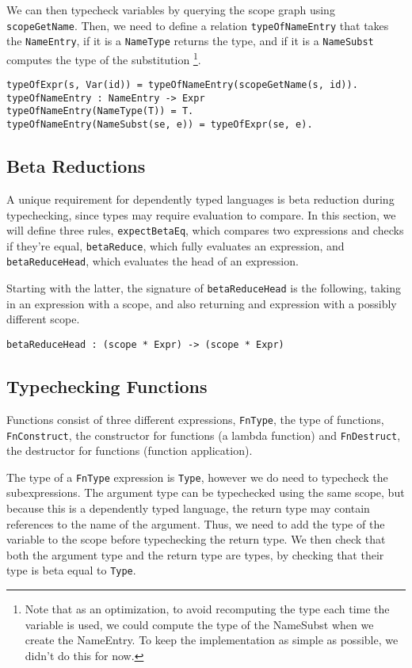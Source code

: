 We can then typecheck variables by querying the scope graph using \verb|scopeGetName|. Then, we need to define a relation \verb|typeOfNameEntry| that takes the \verb|NameEntry|, if it is a \verb|NameType| returns the type, and if it is a \verb|NameSubst| computes the type of the substitution \footnote{Note that as an optimization, to avoid recomputing the type each time the variable is used, we could compute the type of the NameSubst when we create the NameEntry. To keep the implementation as simple as possible, we didn't do this for now.}. 

\begin{lstlisting}
typeOfExpr(s, Var(id)) = typeOfNameEntry(scopeGetName(s, id)).
typeOfNameEntry : NameEntry -> Expr
typeOfNameEntry(NameType(T)) = T.
typeOfNameEntry(NameSubst(se, e)) = typeOfExpr(se, e).
\end{lstlisting}

\subsection{Beta Reductions}
A unique requirement for dependently typed languages is beta reduction during typechecking, since types may require evaluation to compare.  In this section, we will define three rules, \verb|expectBetaEq|, which compares two expressions and checks if they're equal, \verb|betaReduce|, which fully evaluates an expression, and \verb|betaReduceHead|, which evaluates the head of an expression.

Starting with the latter, the signature of \verb|betaReduceHead| is the following, taking in an expression with a scope, and also returning and expression with a possibly different scope.

\begin{lstlisting}
betaReduceHead : (scope * Expr) -> (scope * Expr)
\end{lstlisting}



\subsection{Typechecking Functions}

Functions consist of three different expressions, \verb|FnType|, the type of functions, \verb|FnConstruct|, the constructor for functions (a lambda function) and \verb|FnDestruct|, the destructor for functions (function application).

 The type of a \verb|FnType| expression is \verb|Type|, however we do need to typecheck the subexpressions. The argument type can be typechecked using the same scope, but because this is a dependently typed language, the return type may contain references to the name of the argument. Thus, we need to add the type of the variable to the scope before typechecking the return type. We then check that both the argument type and the return type are types, by checking that their type is beta equal to \verb|Type|.
 
